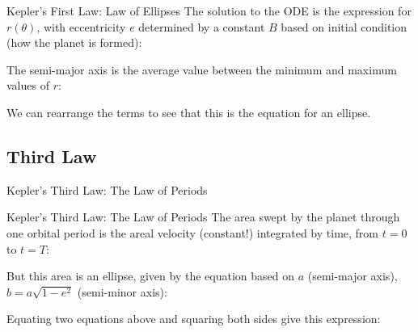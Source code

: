 \documentclass[12pt,compress,aspectratio=169]{beamer}
\begin{document}
\begin{frame}{Kepler's First Law: Law of Ellipses}
  The solution to the ODE is the expression for $r(\theta)$, with eccentricity
  $e$ determined by a constant $B$ based on initial condition (how the planet
  is formed):


  The semi-major axis is the average value between the minimum and maximum
  values of $r$:
  

  We can rearrange the terms to see that this is the equation for an ellipse.
\end{frame}



\subsection{Third Law}

\begin{frame}{Kepler's Third Law: The Law of Periods}
  \centering

  \vspace{.2in}
\end{frame}



\begin{frame}{Kepler's Third Law: The Law of Periods}
  The area swept by the planet through one orbital period is the areal velocity
  (constant!) integrated by time, from $t=0$ to $t=T$:

  
  But this area is an ellipse, given by the equation based on $a$ (semi-major
  axis), $b=a\sqrt{1-e^2}$ (semi-minor axis):


  Equating two equations above and squaring both sides give this expression:

\end{frame}
\end{document}

